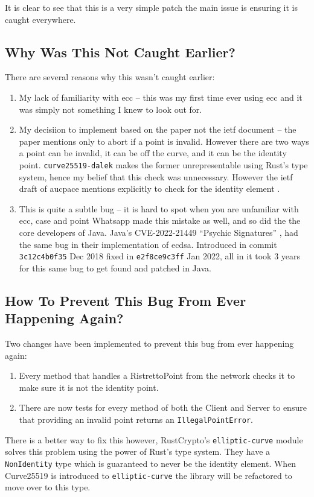 It is clear to see that this is a very simple patch the main issue is ensuring it is caught everywhere.

\subsection{Why Was This Not Caught Earlier?}
There are several reasons why this wasn't caught earlier:
\begin{enumerate}
  \item{My lack of familiarity with \gls{ecc} -- this was my first time ever using \gls{ecc} and it was simply not something I knew to look out for.}
  \item{My decisiion to implement based on the paper not the \gls{ietf} document -- the paper mentions only to abort if a point is invalid. However there are two ways a point can be invalid, it can be off the curve, and it can be the identity point. \texttt{curve25519-dalek} makes the former unrepresentable using Rust's type system, hence my belief that this check was unnecessary. However the \gls{ietf} draft of \gls{aucpace} mentions explicitly to check for the identity element \cite{ietf-aucpace}.}
  \item{This is quite a subtle bug -- it is hard to spot when you are unfamiliar with \gls{ecc}, case and point Whatsapp made this mistake as well, and so did the the core developers of Java. Java's CVE-2022-21449 \enquote{Psychic Signatures} \cite{java-psychic-signatures}, had the same bug in their implementation of \gls{ecdsa}. Introduced in commit \texttt{3c12c4b0f35} Dec 2018 fixed in \texttt{e2f8ce9c3ff} Jan 2022, all in it took 3 years for this same bug to get found and patched in Java.}
\end{enumerate}

\subsection{How To Prevent This Bug From Ever Happening Again?}
Two changes have been implemented to prevent this bug from ever happening again:
\begin{enumerate}
  \item{Every method that handles a RistrettoPoint from the network checks it to make sure it is not the identity point.}
  \item{There are now tests for every method of both the Client and Server to ensure that providing an invalid point returns an \texttt{IllegalPointError}.}
\end{enumerate}

There is a better way to fix this however, RustCrypto's \texttt{elliptic-curve} module solves this problem using the power of Rust's type system.
They have a \texttt{NonIdentity} type which is guaranteed to never be the identity element.
When Curve25519 is introduced to \texttt{elliptic-curve} the library will be refactored to move over to this type.

